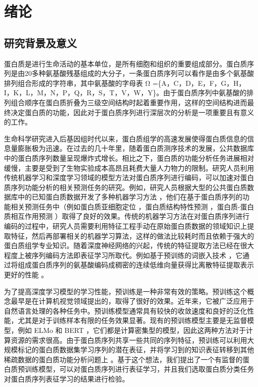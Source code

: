 
\chapter{绪论}

\section{研究背景及意义}
蛋白质是进行生命活动的基本单位，是所有细胞和组织的重要组成部分。蛋白质序列是由20多种氨基酸残基组成的大分子，一条蛋白质序列可以看作是由多个氨基酸排列组合形成的字符串，其中氨基酸的字母表 Ω =\{A，C，D，E，F，G，H，I，K，L，M，N，P，Q，R，S，T，V，W，Y\}。由于蛋白质序列中氨基酸的排列组合顺序在蛋白质折叠为三级空间结构时起着重要作用，这样的空间结构进而最终决定蛋白质的功能，因此对于蛋白质序列进行深层次的分析是一项重要且有意义的工作。

生命科学研究进入后基因组时代以来，蛋白质组学的高速发展使得蛋白质信息的信息量膨胀极为迅速。在过去的几十年里，随着蛋白质测序技术的发展，公共数据库中的蛋白质序列数量呈现爆炸式增长。相比之下，蛋白质的功能分析任务进展相对缓慢，主要是受到了生物实验成本高昂且耗费大量人力物力的限制。研究人员利用传统机器学习和深度学习领域的模型方法对蛋白质序列进行编码，可以加速对蛋白质序列功能分析的相关预测任务的研究。例如，研究人员根据大型的公共蛋白质数据库中的已知蛋白质数据开发了多种机器学习方法 \cite{min2017deep, almagro2017deeploc}，他们在基于蛋白质序列的功能相关预测任务中（例如蛋白质亚细胞定位 \cite{dong2015bean, cheng2018ploc, nair2005mimicking}，蛋白质结构特性预测 \cite{liu2010high, yang2009prediction}，蛋白质-蛋白质相互作用预测 \cite{qi2005random, qi2006evaluation}）取得了良好的效果。传统的机器学习方法在对蛋白质序列进行编码的过程中，研究人员需要利用特征工程手动在原始蛋白质数据的领域知识上提取特征，然后再部署相关的机器学习算法，这样的做法比较耗时而且依赖于强大的蛋白质组学专业知识。随着深度神经网络的兴起，传统的特征提取方法已经在很大程度上被序列编码方法即表征学习所取代。例如基于预训练的词嵌入技术 \cite{mikolov2013distributed, pennington2014glove}，它通过将组成蛋白质序列的氨基酸编码成稠密的连续低维向量获得比离散特征提取表示更好的性能 \cite{asgari2015continuous, heinzinger2019modeling, hamid2019identifying}。

为了提高深度学习模型的学习性能，预训练是一种非常有效的策略。预训练这个概念最早是在计算机视觉领域提出的，取得了很好的效果。近年来，它被广泛应用于自然语言处理的各种任务中。预训练模型通常具有较快的收敛速度和良好的泛化性能，尤其是对于训练样本有限的任务效果显著。现有的预训练模型主要是无监督模型，例如 ELMo \cite{peters1802deep} 和 BERT \cite{devlin2018bert}，它们都是计算密集型的模型，因此这两种方法对于计算资源的需求很高。由于蛋白质序列共享一些共同的序列特征，预训练可以利用大规模标记的蛋白质数据集学习序列的潜在表征，并将学习到的知识表征转移到其他稀疏数据的蛋白质功能分析问题上 \cite{filipavicius2020pre, min2021pre}。基于这个想法，我们提出了一个有监督的蛋白质预训练模型，可以对蛋白质序列进行表征学习，并且我们选取蛋白质分类任务对蛋白质序列表征学习的结果进行检验。 

